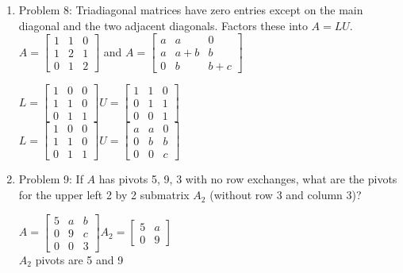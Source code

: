 \documentclass{article}
\renewcommand{\(}{\left(}
\renewcommand{\)}{\right)}
\theoremstyle{plain}
\theoremstyle{plain}
\theoremstyle{definition}
\begin{document}
\begin{enumerate}[label*=\arabic*.,ref=\arabic*]
\item Problem 8: Triadiagonal matrices have zero entries except on the main diagonal and the two adjacent diagonals. Factors these into $A = LU$. $A = \begin{bmatrix} 1 & 1 & 0 \\ 1 & 2 & 1 \\ 0 & 1 & 2 \end{bmatrix}$ and $A = \begin{bmatrix} a & a & 0 \\ a & a+b & b \\ 0 & b & b+c \end{bmatrix}$
\begin{shaded}

$L = \begin{bmatrix} 1 & 0 & 0 \\ 1 & 1 & 0 \\ 0 & 1 & 1 \end{bmatrix} U = \begin{bmatrix} 1 & 1 & 0 \\ 0 & 1 & 1 \\ 0 & 0 & 1 \end{bmatrix}$ \\

$L = \begin{bmatrix} 1 & 0 & 0 \\ 1 & 1 & 0 \\ 0 & 1 & 1 \end{bmatrix} U = \begin{bmatrix} a & a & 0 \\ 0 & b & b \\ 0 & 0 & c \end{bmatrix}$
\end{shaded}

\item Problem 9: If $A$ has pivots 5, 9, 3 with no row exchanges, what are the pivots for the upper left 2 by 2 submatrix $A_2$ (without row 3 and column 3)?
\begin{shaded}
$A = \begin{bmatrix} 5 & a & b \\ 0 & 9 & c \\ 0 & 0 & 3 \end{bmatrix} A_2 = \begin{bmatrix} 5 & a \\ 0 & 9 \end{bmatrix}$ \\

$A_2$ pivots are 5 and 9
\end{shaded}


\end{enumerate}
\end{document}

